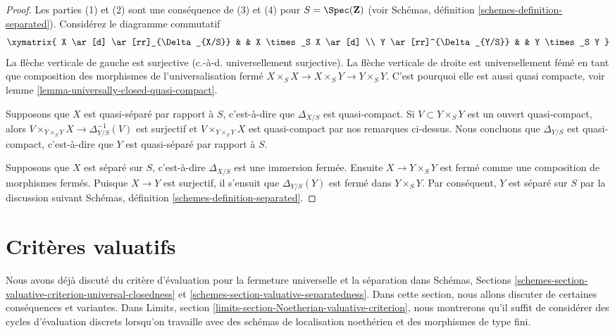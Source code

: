 \begin{proof}
Les parties (1) et (2) sont une conséquence de (3) et (4) pour $S = \Spec(\mathbf{Z})$ (voir Schémas, définition \ref{schemes-definition-separated}). Considérez le diagramme commutatif $$
\xymatrix{
X \ar[d] \ar[rr]_{\Delta_{X/S}} & & X \times_S X \ar[d] \\
Y \ar[rr]^{\Delta_{Y/S}} & & Y \times_S Y
}
$$ La flèche verticale de gauche est surjective (c.-à-d. universellement surjective). La flèche verticale de droite est universellement fémé en tant que composition des morphismes de l'universalisation fermé $X \times_S X \to X \times_S Y \to Y \times_S Y$. C'est pourquoi elle est aussi quasi compacte, voir lemme \ref{lemma-universally-closed-quasi-compact}.

\medskip\noindent
Supposons que $X$ est quasi-séparé par rapport à $S$, c'est-à-dire que $\Delta_{X/S}$ est quasi-compact. Si $V \subset Y \times_S Y$ est un ouvert quasi-compact, alors $V \times_{Y \times_S Y} X \to \Delta_{Y/S}^{-1}(V)$ est surjectif et $V \times_{Y \times_S Y} X$ est quasi-compact par nos remarques ci-dessus. Nous concluons que $\Delta_{Y/S}$ est quasi-compact, c'est-à-dire que $Y$ est quasi-séparé par rapport à $S$.

\medskip\noindent
Supposons que $X$ est séparé sur $S$, c'est-à-dire $\Delta_{X/S}$ est une immersion fermée. Ensuite $X \to Y \times_S Y$ est fermé comme une composition de morphismes fermés. Puisque $X \to Y$ est surjectif, il s'ensuit que $\Delta_{Y/S}(Y)$ est fermé dans $Y \times_S Y$. Par conséquent, $Y$ est séparé sur $S$ par la discussion suivant Schémas, définition \ref{schemes-definition-separated}.
\end{proof}








\section{Critères valuatifs}
\label{section-valuative-criteria}

\noindent
Nous avons déjà discuté du critère d'évaluation pour la fermeture universelle et la séparation dans Schémas, Sections \ref{schemes-section-valuative-criterion-universal-closedness} et \ref{schemes-section-valuative-separatedness}. Dans cette section, nous allons discuter de certaines conséquences et variantes. Dans Limits, section \ref{limits-section-Noetherian-valuative-criterion}, nous montrerons qu'il suffit de considérer des cycles d'évaluation discrets lorsqu'on travaille avec des schémas de localisation noethérien et des morphismes de type fini.

